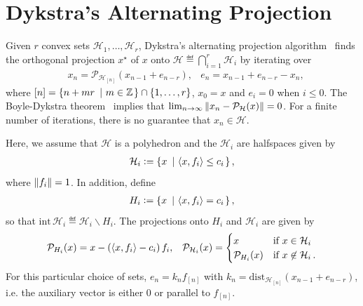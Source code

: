\documentclass[hidelinks]{article}
\begin{document}
\section{Dykstra's Alternating Projection}
Given $r$ convex sets $\mathcal{H}_1,\dots,\mathcal{H}_r$, Dykstra's alternating projection algorithm~\cite{DYKSTRA,Han1988} finds the orthogonal projection $x^\star$ of $x$ onto $\mathcal{H}\eqdef{\bigcap}_{i=1}^r \mathcal{H}_i$ by iterating over
\begin{align}\label{eq:dykstra}
&x_n=\mathcal{P}_{\mathcal{H}_{[n]}}\left(x_{n-1}+e_{n-r}\right),
&e_n=x_{n-1}+e_{n-r}-x_n,
\end{align}
where $[n]= \left\{ n+mr\ \left| \ m\in\mathbb{Z} \right. \right\}\cap\lbrace 1,\dots,r\rbrace$,  $x_0=x$ and $e_i=0$ when $i\leq 0$. The Boyle-Dykstra theorem~\cite{DYKSTRA} implies that $\lim_{n\rightarrow\infty}\Vert x_n-\mathcal{P}_\mathcal{H}(x) \Vert=0$. For a finite number of iterations, there is no guarantee that $x_n\in\mathcal{H}$. 

Here, we assume that $\mathcal{H}$ is a polyhedron and the $\mathcal{H}_i$ are halfspaces given by
\begin{align}\label{eq:sets_i}
\mathcal{H}_i\vcentcolon=\left\{ x\ \left| \ \left\langle x , f_i \right\rangle \leq c_i \right. \right\},
\end{align}
where $\Vert f_i \Vert=1$. In addition, define
\begin{align}\label{eq:sets_i2}
H_i\vcentcolon=\left\{ x\ \left| \ \left\langle x , f_i \right\rangle = c_i \right. \right\},
\end{align}
so that $\text{int}\,\mathcal{H}_i\eqdef\mathcal{H}_i\backslash H_i$. The projections onto $H_i$ and $\mathcal{H}_i$ are given by
\begin{align}
&\mathcal{P}_{H_i}(x)=x-\left(\left\langle x , f_i \right\rangle - c_i\right)f_i,
&\mathcal{P}_{\mathcal{H}_i}(x)=\begin{cases}
x & \text{if } x\in\mathcal{H}_i\\
\mathcal{P}_{H_i}(x) & \text{if } x\not\in\mathcal{H}_i\,.
\end{cases}
\end{align}
For this particular choice of sets, $e_n = k_n f_{[n]}$ with $k_n=\text{dist}_{\mathcal{H}_{[n]}}(x_{n-1}+e_{n-r})$, i.e. the auxiliary vector is either $0$ or parallel to $f_{[n]}$. 
\end{document}
